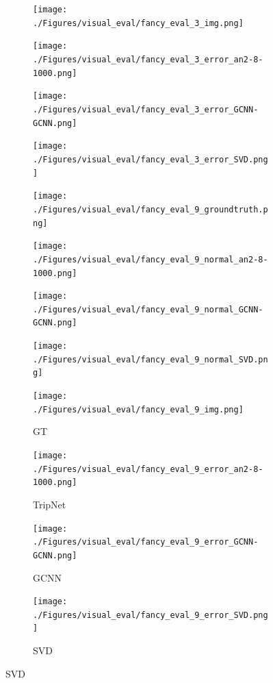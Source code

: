 \documentclass[border=15pt, multi, tikz]{article}
\begin{document}
\begin{figure}
	
	
	\begin{subfigure}[b]{0.24\linewidth}
		\texttt{[image: ./Figures/visual\_eval/fancy\_eval\_3\_img.png]}
	\end{subfigure}
	\begin{subfigure}[b]{0.24\linewidth}
		\texttt{[image: ./Figures/visual\_eval/fancy\_eval\_3\_error\_an2-8-1000.png]}
	\end{subfigure}
	\begin{subfigure}[b]{0.24\linewidth}
		\texttt{[image: ./Figures/visual\_eval/fancy\_eval\_3\_error\_GCNN-GCNN.png]}
	\end{subfigure}
	\begin{subfigure}[b]{0.24\linewidth}
		\texttt{[image: ./Figures/visual\_eval/fancy\_eval\_3\_error\_SVD.png]}
	\end{subfigure}
	
	\begin{subfigure}[b]{0.24\linewidth}
		\texttt{[image: ./Figures/visual\_eval/fancy\_eval\_9\_groundtruth.png]}
	\end{subfigure}
	\begin{subfigure}[b]{0.24\linewidth}
		\texttt{[image: ./Figures/visual\_eval/fancy\_eval\_9\_normal\_an2-8-1000.png]}
	\end{subfigure}
	\begin{subfigure}[b]{0.24\linewidth}
		\texttt{[image: ./Figures/visual\_eval/fancy\_eval\_9\_normal\_GCNN-GCNN.png]}
	\end{subfigure}
	\begin{subfigure}[b]{0.24\linewidth}
		\texttt{[image: ./Figures/visual\_eval/fancy\_eval\_9\_normal\_SVD.png]}
	\end{subfigure}
	
	
	\begin{subfigure}[b]{0.24\linewidth}
		\texttt{[image: ./Figures/visual\_eval/fancy\_eval\_9\_img.png]}
		\caption{GT}
	\end{subfigure}
	\begin{subfigure}[b]{0.24\linewidth}
		\texttt{[image: ./Figures/visual\_eval/fancy\_eval\_9\_error\_an2-8-1000.png]}
		\caption{TripNet}
	\end{subfigure}
	\begin{subfigure}[b]{0.24\linewidth}
		\texttt{[image: ./Figures/visual\_eval/fancy\_eval\_9\_error\_GCNN-GCNN.png]}
		\caption{GCNN}
	\end{subfigure}
	\begin{subfigure}[b]{0.24\linewidth}
		\texttt{[image: ./Figures/visual\_eval/fancy\_eval\_9\_error\_SVD.png]}
		\caption{SVD}
	\end{subfigure}
	

\end{figure}
\end{document}
